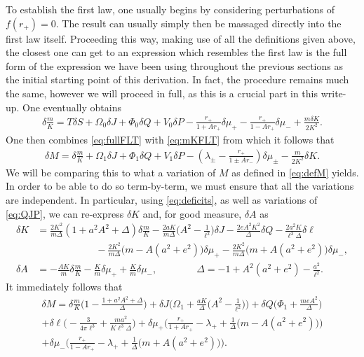 \documentclass[
twoside,openright,frontopenright]{dmathesis}
\newcommand{\nn}{\nonumber}
\begin{document}
To establish the first law, one usually begins by considering perturbations of
$f(r_+)=0$. The result can usually simply then be massaged directly into the
first law itself. Proceeding this way, making use of all the definitions given
above, the closest one can get to an expression which resembles the first law is
the full form of the expression we have been using throughout the previous
sections as the initial starting point of this derivation. In fact, the
procedure remains much the same, however we will proceed in full, as this is a
crucial part in this write-up. One eventually obtains
\begin{align}\label{eq:mKFLT}
\delta \frac{m}{K} = T\delta S + \Omega_0 \delta J + \Phi_0 \delta Q + V_0
  \delta P - \frac{r_+}{1+Ar_+} \delta \mu_+ - \frac{r_+}{1-Ar_+}\delta \mu_-
  +\frac{m\delta K}{2K^2}. 
\end{align}
One then combines \cref{eq:fullFLT} with \cref{eq:mKFLT} from which it follows that
\begin{align}
\delta M = \delta \frac{m}{K} + \Omega_1 \delta J + \Phi_1 \delta Q + V_1 \delta
  P - \left(\lambda_\pm - \frac{r_+}{1\pm Ar_-}\right) \delta \mu_\pm -
  \frac{m}{2K^2}\delta K. 
\end{align}
We will be comparing this to what a variation of $M$ as defined in
\cref{eq:defM} yields. In order to be able to do so term-by-term, we must ensure
that all the variations are independent. In particular, using
\cref{eq:deficits}, as well as variations of \cref{eq:QJP}, we can re-express
$\delta K$ and, for good measure, $\delta A$ as
\begin{align}
\delta K &=\frac{2K^2}{m\Delta}(1+a^2A^2+\Delta) \delta \frac{m}{K} \nn -
           \frac{2aK}{m\Delta}\Big(A^2-\frac{1}{\ell^2}\Big)\delta
           J-\frac{2eA^2K^2}{\Delta}\delta Q-\frac{2a^2K}{\ell^3\Delta}\delta
           \ell\\ 
&\qquad\qquad\qquad -\frac{2K^2}{m\Delta}\big(m-A(a^2+e^2)\big)\delta\mu_+
                     -\frac{2K^2}{m\Delta}\big(m+A(a^2+e^2)\big)\delta\mu_-,
                     \nn\\ 
\delta A &=-\frac{A K}{m}\delta\frac{m}{K}-\frac{K}{m}\delta\mu_+ +
           \frac{K}{m}\delta \mu_-, \qquad \qquad \Delta =
           -1+A^2(a^2+e^2)-\frac{a^2}{\ell^2}. 
\label{eq:dKdA}
\end{align}
It immediately follows that
\begin{multline}
\delta M = \delta\frac{m}{K} \Big(1-\frac{1+a^2A^2+\Delta}{\Delta}\Big) 
+\delta J \bigg(\Omega_1+\frac{aK}{\Delta}\Big(A^2-\frac{1}{\ell^2}\Big)\bigg) 
+\delta Q \bigg(\Phi_1+\frac{meA^2}{\Delta}\bigg) \\
+\delta\ell \Big(-\frac{3}{4\pi\ell^3}+\frac{ma^2}{K\ell^3\Delta}\Big) 
+\delta \mu_+\Big(\frac{r_+}{1+Ar_+}-\lambda_+
+\frac{1}{\Delta}\big(m-A(a^2+e^2)\big)\Big)\\ 
+\delta \mu_-\Big(\frac{r_+}{1-Ar_+}-\lambda_+
+\frac{1}{\Delta}\big(m+A(a^2+e^2)\big)\Big). 
\label{eq:dM1}
\end{multline}
\end{document}
